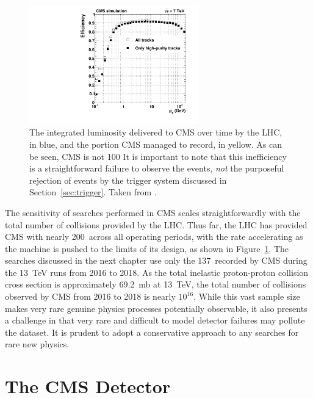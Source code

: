     \begin{figure}[h!]
    \centering
    \includegraphics[width=0.65\textwidth]{figures/efficiencyVsPt.pdf}
    \caption[CMS integrated luminosity delivered and recorded over time.]{
      The integrated luminosity delivered to CMS over time by the LHC, in blue, and the portion CMS managed to record, in yellow.
      As can be seen, CMS is not 100%
      It is important to note that this inefficiency is a straightforward failure to observe the events, {\it not} the purposeful rejection of events by the trigger system discussed in Section~\ref{sec:trigger}.
      Taken from \cite{lumipublic}.}
    \label{fig:intlumi}
  \end{figure}  


  The sensitivity of searches performed in CMS scales straightforwardly with the total number of collisions provided by the LHC.
  Thus far, the LHC has provided CMS with nearly 200~\fbinv across all operating periods, with the rate accelerating as the machine is pushed to the limits of its design, as shown in Figure~\ref{fig:intlumi}.
  The searches discussed in the next chapter use only the 137~\fbinv recorded by CMS during the 13~TeV runs from 2016 to 2018.
  As the total inelastic proton-proton collision cross section is approximately 69.2~mb at 13~TeV, the total number of collisions observed by CMS from 2016 to 2018 is nearly $10^{16}$.
  While this vast sample size makes very rare genuine physics processes potentially observable, it also presents a challenge in that very rare and difficult to model detector failures may pollute the dataset.
  It is prudent to adopt a conservative approach to any searches for rare new physics.

\section{The CMS Detector} \label{sec:CMS}


